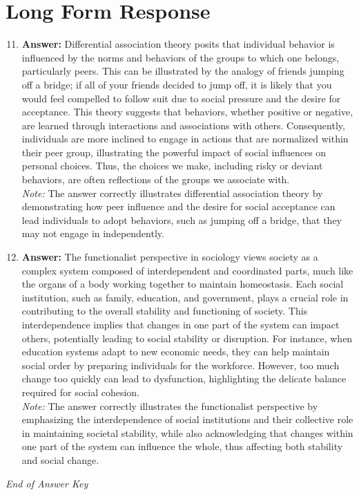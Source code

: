\documentclass[12pt]{article}
\begin{document}
\section*{Long Form Response}
\begin{enumerate}[label=\arabic*.]
\setcounter{enumi}{10}
\item \textbf{Answer:} Differential association theory posits that individual behavior is influenced by the norms and behaviors of the groups to which one belongs, particularly peers. This can be illustrated by the analogy of friends jumping off a bridge; if all of your friends decided to jump off, it is likely that you would feel compelled to follow suit due to social pressure and the desire for acceptance. This theory suggests that behaviors, whether positive or negative, are learned through interactions and associations with others. Consequently, individuals are more inclined to engage in actions that are normalized within their peer group, illustrating the powerful impact of social influences on personal choices. Thus, the choices we make, including risky or deviant behaviors, are often reflections of the groups we associate with.
\\ \textit{Note:} The answer correctly illustrates differential association theory by demonstrating how peer influence and the desire for social acceptance can lead individuals to adopt behaviors, such as jumping off a bridge, that they may not engage in independently.
\item \textbf{Answer:} The functionalist perspective in sociology views society as a complex system composed of interdependent and coordinated parts, much like the organs of a body working together to maintain homeostasis. Each social institution, such as family, education, and government, plays a crucial role in contributing to the overall stability and functioning of society. This interdependence implies that changes in one part of the system can impact others, potentially leading to social stability or disruption. For instance, when education systems adapt to new economic needs, they can help maintain social order by preparing individuals for the workforce. However, too much change too quickly can lead to dysfunction, highlighting the delicate balance required for social cohesion.
\\ \textit{Note:} The answer correctly illustrates the functionalist perspective by emphasizing the interdependence of social institutions and their collective role in maintaining societal stability, while also acknowledging that changes within one part of the system can influence the whole, thus affecting both stability and social change.
\end{enumerate}

\vfill
\noindent\textit{End of Answer Key}
\end{document}
